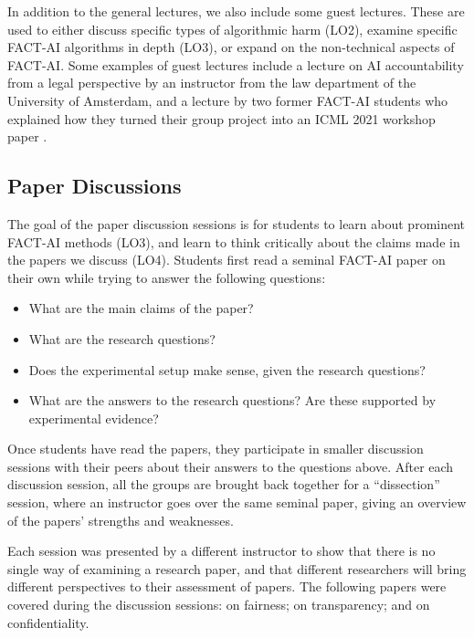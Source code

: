 \documentclass[letterpaper]{article}
\newcommand{\OurUniversity}{the University of Amsterdam}
\begin{document}
In addition to the general lectures, we also include some guest lectures. 
These are used to either discuss specific types of algorithmic harm (LO2), examine specific FACT-AI algorithms in depth (LO3), or expand on the non-technical aspects of FACT-AI. 
Some examples of guest lectures include a lecture on AI accountability from a legal perspective by an instructor from the law department of \OurUniversity{}, and a lecture by two former FACT-AI students who explained how they turned their group project into an ICML 2021 workshop paper \cite{neely2021order}. 

\subsection{Paper Discussions}
The goal of the paper discussion sessions is for students to learn about prominent FACT-AI methods (LO3), and learn to think critically about the claims made in the papers we discuss (LO4). 
Students first read a seminal FACT-AI paper on their own while trying to answer the following questions: 
\begin{itemize}[leftmargin=*,nosep]
\item What are the main claims of the paper?
\item What are the research questions?
\item Does the experimental setup make sense, given the research questions?
\item What are the answers to the research questions? Are these supported by experimental evidence?
\end{itemize}

\noindent%
Once students have read the papers, they participate in smaller discussion sessions with their peers about their answers to the questions above. 
After each discussion session, all the groups are brought back together for a ``dissection'' session, where an instructor goes over the same seminal paper, giving an overview of the papers' strengths and weaknesses. 

Each session was presented by a different instructor to show that there is no single way of examining a research paper, and that different researchers will bring different perspectives to their assessment of papers. 
The following papers were covered during the discussion sessions: 
\citet{hardt_equality_2016} on fairness; 
\citet{ribeiro_why_2016} on transparency; and 
\citet{Abadi_2016} on confidentiality.
\end{document}

